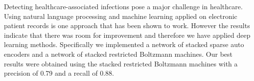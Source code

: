Detecting healthcare-associated infections pose a major challenge in healthcare. Using natural language processing and machine learning applied on electronic patient records is one approach that has been shown to work. However the results indicate that there was room for improvement and therefore we have applied deep learning methods. Specifically we implemented a network of stacked sparse auto encoders and a network of stacked restricted Boltzmann machines. Our best results were obtained using the stacked restricted Boltzmann machines with a precision of 0.79 and a recall of 0.88.
